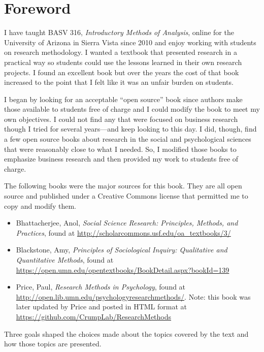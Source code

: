 \chapter*{Foreword}\label{ch:foreword}

I have taught BASV 316, \textit{Introductory Methods of Analysis}, online for the University of Arizona in Sierra Vista since 2010 and enjoy working with students on research methodology. I wanted a textbook that presented research in a practical way so students could use the lessons learned in their own research projects. I found an excellent book but over the years the cost of that book increased to the point that I felt like it was an unfair burden on students. 

I began by looking for an acceptable “open source” book since authors make those available to students free of charge and I could modify the book to meet my own objectives. I could not find any that were focused on business research though I tried for several years—and keep looking to this day. I did, though, find a few open source books about research in the social and psychological sciences that were reasonably close to what I needed. So, I modified those books to emphasize business research and then provided my work to students free of charge. 

The following books were the major sources for this book. They are all open source and published under a Creative Commons license that permitted me to copy and modify them.

\begin{itemize}
	\item Bhattacherjee, Anol, \textit{Social Science Research: Principles, Methods, and Practices}, found at \url{http://scholarcommons.usf.edu/oa_textbooks/3/}
	\item Blackstone, Amy, \textit{Principles of Sociological Inquiry: Qualitative and Quantitative Methods}, found at \url{https://open.umn.edu/opentextbooks/BookDetail.aspx?bookId=139}
	\item Price, Paul, \textit{Research Methods in Psychology}, found at \url{http://open.lib.umn.edu/psychologyresearchmethods/}. Note: this book was later updated by Price and posted in HTML format at \url{https://github.com/CrumpLab/ResearchMethods} 
\end{itemize}

Three goals shaped the choices made about the topics covered by the text and how those topics are presented. 

